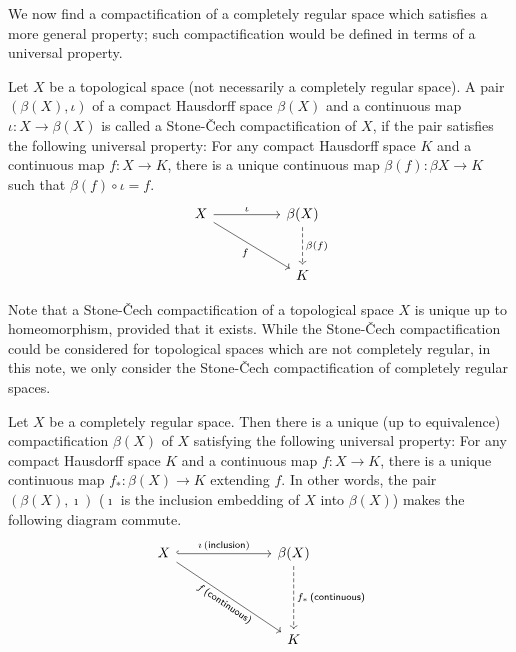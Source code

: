 We now find a compactification of a completely regular space which satisfies a more general property; such compactification would be defined in terms of a universal property.
\begin{defi}
    Let $X$ be a topological space (not necessarily a completely regular space).
    A pair $(\beta(X), \iota)$ of a compact Hausdorff space $\beta(X)$ and a continuous map $\iota: X\rightarrow \beta(X)$ is called a Stone-\v{C}ech compactification of $X$, if the pair satisfies the following universal property:
    For any compact Hausdorff space $K$ and a continuous map $f: X\rightarrow K$, there is a unique continuous map $\beta(f): \beta X\rightarrow K$ such that $\beta(f)\circ\iota = f$.
    \begin{equation*}
        \begin{tikzcd}[row sep=large, column sep=huge]
            X
            \arrow[dr, "f"']
            \arrow[r, "\iota"] &
            \beta(X)
            \arrow[d, "\beta(f)", dashed] \\
            & K
        \end{tikzcd}
    \end{equation*}
\end{defi}

Note that a Stone-\v{C}ech compactification of a topological space $X$ is unique up to homeomorphism, provided that it exists.
While the Stone-\v{C}ech compactification could be considered for topological spaces which are not completely regular, in this note, we only consider the Stone-\v{C}ech compactification of completely regular spaces.

\color{orange}
\begin{thm}
    Let $X$ be a completely regular space.
    Then there is a unique (up to equivalence) compactification $\beta(X)$ of $X$ satisfying the following universal property:
    For any compact Hausdorff space $K$ and a continuous map $f: X\rightarrow K$, there is a unique continuous map $f_*: \beta(X)\rightarrow K$ extending $f$.
    In other words, the pair $(\beta(X), \imath)$ ($\imath$ is the inclusion embedding of $X$ into $\beta(X)$) makes the following diagram commute.
    \begin{equation*}
        \begin{tikzcd}[row sep=1.6cm, column sep=2.4cm]
            X
            \arrow[dr, "f\,\textsf{(continuous)}"'{sloped}]
            \arrow[r, "\imath\,(\textsf{inclusion})", hook] &
            \beta(X)
            \arrow[d, "f_*\,\textsf{(continuous)}", dashed] \\
            & K
        \end{tikzcd}
    \end{equation*}
\end{thm}
\color{black}

